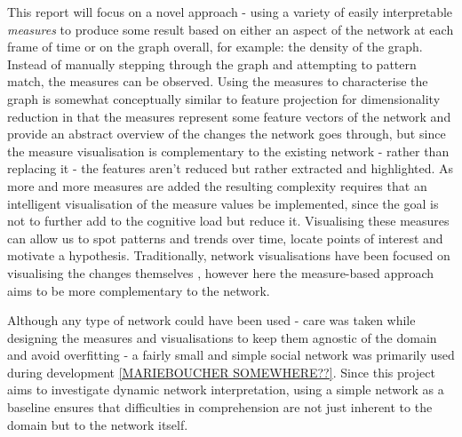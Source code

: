 This report will focus on a novel approach - using a variety of easily interpretable \textit{measures} to produce some result based on either an aspect of the network at each frame of time or on the graph overall, for example: the density of the graph. Instead of manually stepping through the graph and attempting to pattern match, the measures can be observed. Using the measures to characterise the graph is somewhat conceptually similar to feature projection for dimensionality reduction \cite{wikidimred} in that the measures represent some feature vectors of the network and provide an abstract overview of the changes the network goes through, but since the measure visualisation is complementary to the existing network - rather than replacing it - the features aren't reduced but rather extracted and highlighted.
As more and more measures are added the resulting complexity requires that an intelligent visualisation of the measure values be implemented, since the goal is not to further add to the cognitive load but reduce it. Visualising these measures can allow us to spot patterns and trends over time, locate points of interest and motivate a hypothesis. Traditionally, network visualisations have been focused on visualising the changes themselves \cite{tsotaivg}, however here the measure-based approach aims to be more complementary to the network.

Although any type of network could have been used - care was taken while designing the measures and visualisations to keep them agnostic of the domain and avoid overfitting - a fairly small and simple social network was primarily used during development \ref{MARIEBOUCHER SOMEWHERE??}. 
Since this project aims to investigate dynamic network interpretation, using a simple network as a baseline ensures that difficulties in comprehension are not just inherent to the domain but to the network itself. 

